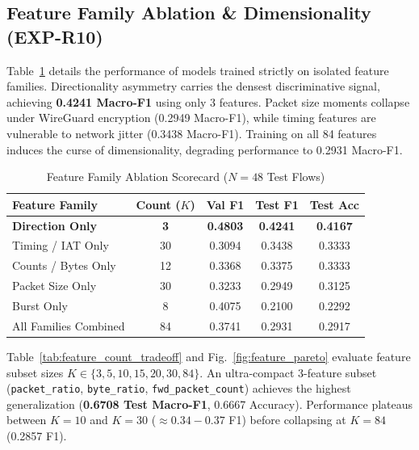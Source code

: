 \documentclass[conference]{IEEEtran}
\begin{document}
\subsection{Feature Family Ablation \& Dimensionality (EXP-R10)}
Table~\ref{tab:feature_family_ablation} details the performance of models trained strictly on isolated feature families. Directionality asymmetry carries the densest discriminative signal, achieving \textbf{0.4241 Macro-F1} using only 3 features. Packet size moments collapse under WireGuard encryption (0.2949 Macro-F1), while timing features are vulnerable to network jitter (0.3438 Macro-F1). Training on all 84 features induces the curse of dimensionality, degrading performance to 0.2931 Macro-F1.

\begin{table}[t]
\centering
\caption{Feature Family Ablation Scorecard ($N=48$ Test Flows)}
\label{tab:feature_family_ablation}
\footnotesize
\begin{tabularx}{\columnwidth}{lcccc}
\toprule
\textbf{Feature Family} & \textbf{Count ($K$)} & \textbf{Val F1} & \textbf{Test F1} & \textbf{Test Acc} \\
\midrule
\textbf{Direction Only} & \textbf{3} & \textbf{0.4803} & \textbf{0.4241} & \textbf{0.4167} \\
Timing / IAT Only & 30 & 0.3094 & 0.3438 & 0.3333 \\
Counts / Bytes Only & 12 & 0.3368 & 0.3375 & 0.3333 \\
Packet Size Only & 30 & 0.3233 & 0.2949 & 0.3125 \\
Burst Only & 8 & 0.4075 & 0.2100 & 0.2292 \\
All Families Combined & 84 & 0.3741 & 0.2931 & 0.2917 \\
\bottomrule
\end{tabularx}
\end{table}

Table~\ref{tab:feature_count_tradeoff} and Fig.~\ref{fig:feature_pareto} evaluate feature subset sizes $K \in \{3, 5, 10, 15, 20, 30, 84\}$. An ultra-compact 3-feature subset (\texttt{packet\_ratio}, \texttt{byte\_ratio}, \texttt{fwd\_packet\_count}) achieves the highest generalization (\textbf{0.6708 Test Macro-F1}, 0.6667 Accuracy). Performance plateaus between $K=10$ and $K=30$ ($\approx 0.34 - 0.37$ F1) before collapsing at $K=84$ (0.2857 F1).
\end{document}

